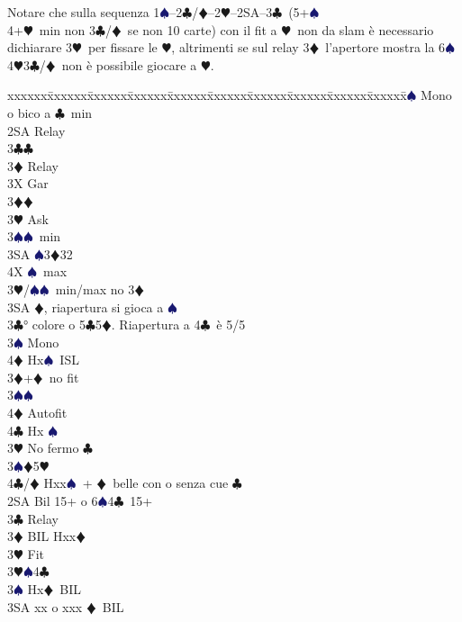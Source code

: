 \documentclass[a4paper,italian]{article}
\newcommand{\BC}{\textcolor{OliveGreen}{$\clubsuit$}}
\newcommand{\BD}{\textcolor{RedOrange}{$\vardiamondsuit$}}
\newcommand{\BH}{\textcolor{Red2}{$\varheartsuit${}}}
\newcommand{\BS}{\textcolor{MidnightBlue}{$\spadesuit${}}}
\newenvironment{bidtable}
{\begin{tabbing}

    xxxxxx\=xxxxxx\=xxxxxx\=xxxxxx\=xxxxxx\=xxxxxx\=xxxxxx\=xxxxxx\=xxxxxx\=xxxxxx\=\kill}
{\end{tabbing} }%
\newenvironment{varie}[1]
{\begin{tcolorbox}[colframe=green!40!black,title=#1]}
    {
\end{tcolorbox} }%
\begin{document}
\begin{multicols}{2}
\begin{varie}{Riepilogo mnemonico per i fissaggi}
    Notare che sulla sequenza 1\BS--2\BC/\BD--2\BH--2SA--3\BC\ (5+\BS\\4+\BH\ min
    non 3\BC/\BD\ se non 10 carte) con il fit a \BH\ non da slam è necessario
    dichiarare 3\BH\ per fissare le \BH, altrimenti se sul relay 3\BD\
    l'apertore mostra la 6\BS4\BH3\BC/\BD\ non è possibile giocare a \BH.
    \end{varie}
    \columnbreak
    \begin{bidtable}
        2\BS \> Mono o bico a \BC\ min\+\\
        2SA \> Relay\+\\
        3\BC {}\BC \+\\
        3\BD \> Relay\+\\
        3X \> Gar\-\-\\
        3\BD {}\BD \+\\
        3\BH \> Ask\+\\
        3\BS {}\BS\ min\\
        3SA \BS 3\BD 32\\
        4X \BS\ max\-\-\\
        3\BH/\BS \> 6\BS\ min/max no 3\BD \\
        3SA \BD , riapertura si gioca a \BS \-\\
        3\BC {}° colore o 5\BC 5\BD . Riapertura a 4\BC\ è 5/5\+\\
        3\BS \> Mono\+\\
        4\BD \> Hx\BS\ ISL\-\-\\
        3\BD {}+\BD\ no fit\+\\
        3\BS \> 6\BS \+\\
        4\BD \> Autofit\\
        4\BC \> Hx \BS \-\-\\
        3\BH \> No fermo \BC \\
        3\BS {}\BD 5\BH \\
        4\BC/\BD \> Hxx\BS\ + \BD\ belle con o senza cue \BC\-\\
        2SA \> Bil 15+ o 6\BS 4\BC\ 15+\+\\
        3\BC \> Relay\+\\
        3\BD \> BIL Hxx\BD \+\\
        3\BH \> Fit\-\\
        3\BH {}\BS 4\BC \\
        3\BS \> Hx\BD\ BIL\\
        3SA \> xx o xxx \BD\ BIL\-\\

\end{bidtable}
\end{multicols}
\end{document}
